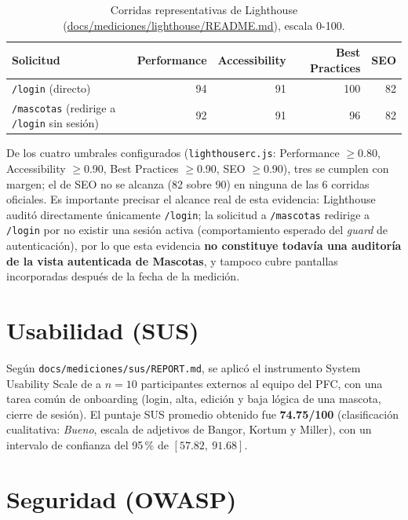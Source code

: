 \begin{table}[H]
  \centering
  \caption{Corridas representativas de Lighthouse (\url{docs/mediciones/lighthouse/README.md}), escala 0-100.}
  \label{tab:lighthouse}
  \begin{tabular}{@{}p{5.4cm}rrrr@{}}
    \toprule
    Solicitud & Performance & Accessibility & Best Practices & SEO \\
    \midrule
    \texttt{/login} (directo) & 94 & 91 & 100 & 82 \\
    \texttt{/mascotas} (redirige a \texttt{/login} sin sesi\'on) & 92 & 91 & 96 & 82 \\
    \bottomrule
  \end{tabular}
\end{table}

De los cuatro umbrales configurados (\texttt{lighthouserc.js}: Performance
$\geq$0.80, Accessibility $\geq$0.90, Best Practices $\geq$0.90, SEO
$\geq$0.90), tres se cumplen con margen; el de SEO no se alcanza (82 sobre
90) en ninguna de las 6 corridas oficiales. Es importante precisar el
alcance real de esta evidencia: Lighthouse audit\'o directamente
\'unicamente \texttt{/login}; la solicitud a \texttt{/mascotas} redirige a
\texttt{/login} por no existir una sesi\'on activa (comportamiento
esperado del \emph{guard} de autenticaci\'on), por lo que esta evidencia
\textbf{no constituye todav\'ia una auditor\'ia de la vista autenticada de
Mascotas}, y tampoco cubre pantallas incorporadas despu\'es de la fecha de
la medici\'on.

\section{Usabilidad (SUS)}
\label{sec:resultados-sus}

Seg\'un \texttt{docs/mediciones/sus/REPORT.md}, se aplic\'o el
instrumento System Usability Scale de \textcite{sus-brooke1996} a
$n=10$ participantes externos al equipo del PFC, con una tarea com\'un de
onboarding (login, alta, edici\'on y baja l\'ogica de una mascota, cierre
de sesi\'on). El puntaje SUS promedio obtenido fue \textbf{74.75/100}
(clasificaci\'on cualitativa: \emph{Bueno}, escala de adjetivos de Bangor,
Kortum y Miller), con un intervalo de confianza del 95\,\% de
$[57.82,\ 91.68]$.

\section{Seguridad (OWASP)}
\label{sec:resultados-seguridad}

